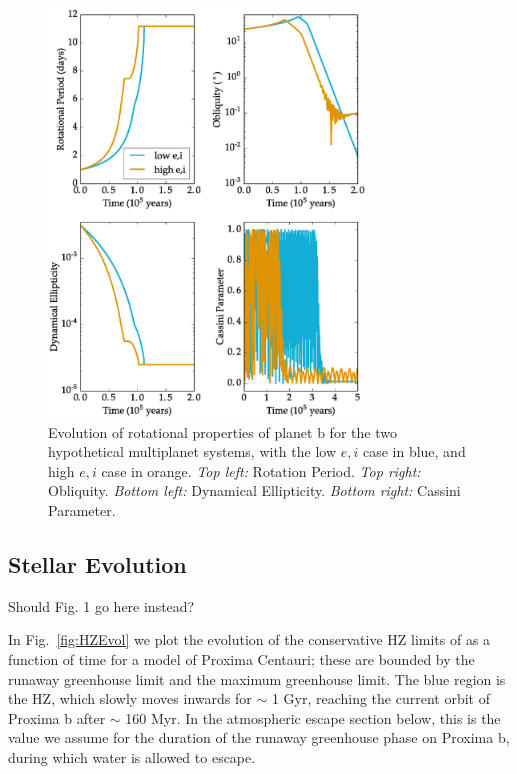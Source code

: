 \documentclass[preprint,12pt]{aastex}
\newcommand{\xxx}[1]{{\color{red} #1}} %
\begin{document}
\begin{figure} 
\begin{center}
\includegraphics[width=0.75\textwidth]{MultiSpins2.eps}
\end{center}
\caption{Evolution of rotational properties of planet b for the two hypothetical multiplanet systems, with the low $e,i$ case in blue, and high $e,i$ case in orange. {\it Top left:} Rotation Period. {\it Top right:} Obliquity. {\it Bottom left:} Dynamical Ellipticity. {\it Bottom right:} Cassini Parameter.}
\label{fig:MultiSpins}
\end{figure}




\subsection{Stellar Evolution}
\label{sec:results:stellar}

\xxx{Should Fig. 1 go here instead?}

In Fig.~\ref{fig:HZEvol} we plot the evolution of the conservative HZ
limits of \cite{Kopparapu13} as a function of time for a model of
Proxima Centauri; these are bounded by the runaway greenhouse limit
and the maximum greenhouse limit. The blue region is the HZ, which
slowly moves inwards for $\sim$ 1 Gyr, reaching the current orbit of
Proxima b after $\sim$ 160 Myr. In the atmospheric escape section
below, this is the value we assume for the duration of the runaway
greenhouse phase on Proxima b, during which water is allowed to
escape.
\end{document}

